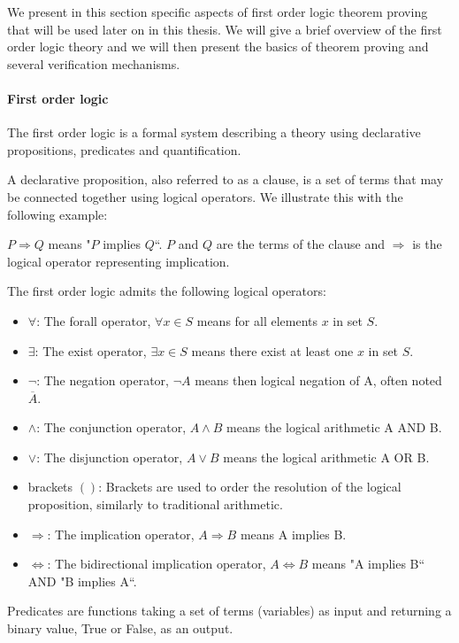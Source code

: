 \label{sec:proving-theory}
We present in this section specific aspects of first order logic theorem proving that will be used later on in this thesis. We will give a brief overview of the first order logic theory and we will then present the basics of theorem proving and several verification mechanisms.

\paragraph{First order logic}
The first order logic is a formal system describing a theory using declarative propositions, predicates and quantification.

A declarative proposition, also referred to as a clause, is a set of terms  that may be connected together using logical operators.
We illustrate this with the following example:

$P \Rightarrow Q$ means "$P$ implies $Q$``. $P$ and $Q$ are the terms of the clause and $\Rightarrow$ is the logical operator representing implication.

The first order logic admits the following logical operators:

\begin{itemize}
    \item $\forall$: The forall operator, $\forall x\in S$ means for all elements $x$ in set $S$.
    \item $\exists$: The exist operator, $\exists x\in S$ means there exist at least one $x$ in set $S$.
    \item $\neg$: The negation operator, $\neg A$ means then logical negation of A, often noted $\overline{A}$.
    \item $\wedge$: The conjunction operator, $A \wedge B$ means the logical arithmetic A AND B.
    \item $\vee$: The disjunction operator, $A \vee B$ means the logical arithmetic A OR B.
    \item brackets $( )$: Brackets are used to order the resolution of the logical proposition, similarly to traditional arithmetic.
    \item $\Rightarrow$: The implication operator, $A \Rightarrow B$ means A implies B.
    \item $\Leftrightarrow$: The bidirectional implication operator, $A \Leftrightarrow B$ means "A implies B`` AND "B implies A``.
\end{itemize}

Predicates are functions taking a set of terms (variables) as input and returning a binary value, True or False, as an output.

